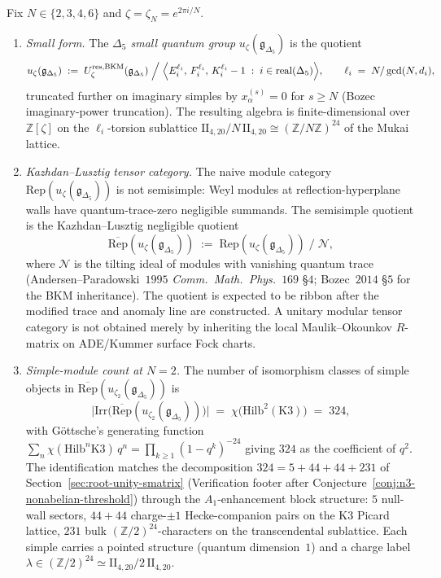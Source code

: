 \begin{conjecture}
\label{conj:k3qt-small-quantum-group-delta5-rootofunity}
\ClaimStatusConjectured
Fix $N \in \{2, 3, 4, 6\}$ and $\zeta = \zeta_N = e^{2\pi i/N}$.
\begin{enumerate}[label=\textup{(\roman*)}]
\item \emph{Small form.} The \emph{$\Delta_5$ small quantum group}
$u_\zeta(\mathfrak g_{\Delta_5})$ is the quotient
\[
 u_\zeta(\mathfrak g_{\Delta_5})
 \;:=\;
 U^{\mathrm{res}, \mathrm{BKM}}_\zeta(\mathfrak g_{\Delta_5})
 \;\Big/\;
 \Bigl\langle E_i^{\ell_i},\, F_i^{\ell_i},\, K_i^{\ell_i} - 1
 \;:\; i \in \mathrm{real}(\Delta_5) \Bigr\rangle,
 \qquad \ell_i \;=\; N/\gcd(N, d_i),
\]
truncated further on imaginary simples by
$x_\alpha^{(s)} = 0$ for $s \geq N$ (Bozec imaginary-power truncation).
The resulting algebra is finite-dimensional over $\mathbb Z[\zeta]$
on the $\ell_i$-torsion sublattice
$\mathrm{II}_{4, 20}/N\,\mathrm{II}_{4, 20}
 \cong (\mathbb Z/N\mathbb Z)^{24}$ of the Mukai lattice.

\item \emph{Kazhdan--Lusztig tensor category.} The naive module
category $\mathrm{Rep}(u_\zeta(\mathfrak g_{\Delta_5}))$ is not
semisimple: Weyl modules at reflection-hyperplane walls have
quantum-trace-zero negligible summands. The semisimple quotient is
the Kazhdan--Lusztig negligible quotient
\[
 \overline{\mathrm{Rep}}(u_\zeta(\mathfrak g_{\Delta_5}))
 \;:=\;
 \mathrm{Rep}(u_\zeta(\mathfrak g_{\Delta_5}))
 \;\big/\; \mathcal N,
\]
where $\mathcal N$ is the tilting ideal of modules with vanishing
quantum trace (Andersen--Paradowski~$1995$ \emph{Comm.~Math.~Phys.}~$169$
\S$4$; Bozec~$2014$ \S$5$ for the BKM inheritance).
The quotient is expected to be ribbon after the modified trace and
anomaly line are constructed. A unitary modular tensor category is not
obtained merely by inheriting the local Maulik--Okounkov \(R\)-matrix on
ADE/Kummer surface Fock charts.

\item \emph{Simple-module count at $N = 2$.} The number of isomorphism
classes of simple objects in
$\overline{\mathrm{Rep}}(u_{\zeta_2}(\mathfrak g_{\Delta_5}))$ is
\[
 \bigl|\mathrm{Irr}\bigl(\overline{\mathrm{Rep}}
 (u_{\zeta_2}(\mathfrak g_{\Delta_5}))\bigr)\bigr|
 \;=\;
 \chi\bigl(\mathrm{Hilb}^2(\mathrm{K3})\bigr)
 \;=\;
 324,
\]
with G\"ottsche's generating function
$\sum_n \chi(\mathrm{Hilb}^n \mathrm K3)\,q^n
 = \prod_{k \geq 1}(1 - q^k)^{-24}$ giving
$324$ as the coefficient of $q^2$. The identification matches the
decomposition $324 = 5 + 44 + 44 + 231$ of
Section~\ref{sec:root-unity-smatrix} (Verification footer after
Conjecture~\ref{conj:n3-nonabelian-threshold}) through the
$A_1$-enhancement block structure: $5$ null-wall sectors,
$44 + 44$ charge-$\pm 1$ Hecke-companion pairs on the K3 Picard
lattice, $231$ bulk $(\mathbb Z/2)^{24}$-characters on the transcendental
sublattice. Each simple carries a pointed structure (quantum
dimension~$1$) and a charge label
$\lambda \in (\mathbb Z/2)^{24} \simeq \mathrm{II}_{4, 20}/2\,\mathrm{II}_{4, 20}$.


\end{enumerate}
\end{conjecture}
